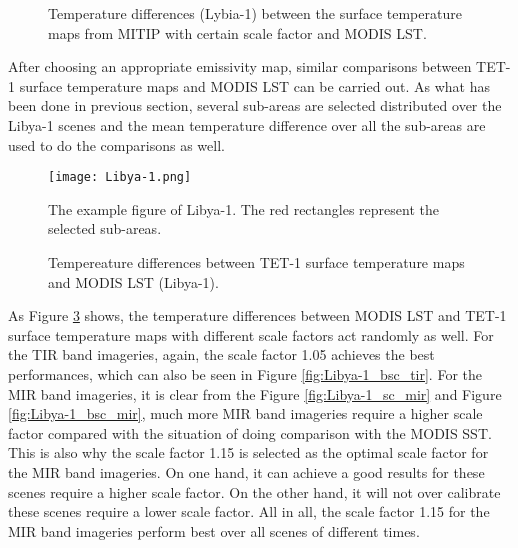 \begin{figure}[!htbp]
\centering
{}
\hspace{0.5in}
\caption{Temperature differences (Lybia-1) between the surface temperature maps from MITIP with certain scale factor and MODIS LST.}
\label{fig:diff_emi_Lybia2}
\end{figure}

\noindent After choosing an appropriate emissivity map, similar comparisons between TET-1 surface temperature maps and MODIS LST can be carried out. As what has been done in previous section, several sub-areas are selected distributed over the Libya-1 scenes and the mean temperature difference over all the sub-areas are used to do the comparisons as well.\\

\begin{figure}[!htbp]
\centering
\texttt{[image: Libya-1.png]}
\caption{The example figure of Libya-1. The red rectangles represent the selected sub-areas.}
\label{fig:Libya1_sub_areas}
\end{figure}

\begin{figure}[!htbp]
\centering
{}
\hspace{0.5in}
\caption{Tempereature differences between TET-1 surface temperature maps and MODIS LST (Libya-1).}
\label{fig:Libya-1_sc_mir_tir}
\end{figure}

\noindent As Figure \ref{fig:Libya-1_sc_mir_tir} shows, the temperature differences between MODIS LST and TET-1 surface temperature maps with different scale factors act randomly as well. For the TIR band imageries, again, the scale factor 1.05 achieves the best performances, which can also be seen in Figure \ref{fig:Libya-1_bsc_tir}. For the MIR band imageries, it is clear from the Figure \ref{fig:Libya-1_sc_mir} and Figure \ref{fig:Libya-1_bsc_mir}, much more MIR band imageries require a higher scale factor compared with the situation of doing comparison with the MODIS SST. This is also why the scale factor 1.15 is selected as the optimal scale factor for the MIR band imageries. On one hand, it can achieve a good results for these scenes require a higher scale factor. On the other hand, it will not over calibrate these scenes require a lower scale factor. All in all, the scale factor 1.15 for the MIR band imageries perform best over all scenes of different times.\\

